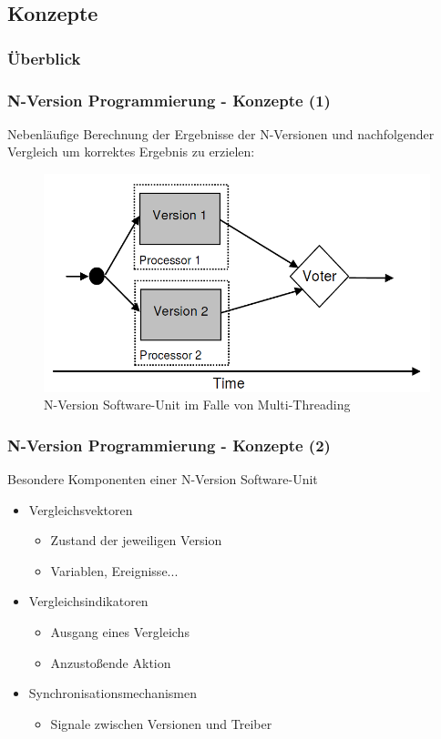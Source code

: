 \subsection{Konzepte}
%
%
\begin{frame}
	\frametitle{Überblick}
	\tableofcontents[currentsubsection]
\end{frame}
%
%
\begin{frame}
	\frametitle{N-Version Programmierung - Konzepte (1)}
	Nebenläufige Berechnung der Ergebnisse der N-Versionen und nachfolgender Vergleich um korrektes Ergebnis zu erzielen:
	\begin{figure}
		\includegraphics[scale=0.3]{grafiken/multi-thread-n-version.png}		
		\caption{N-Version Software-Unit im Falle von Multi-Threading
			\footnotemark		
		}		
	\end{figure}
\end{frame}
%
%
\begin{frame}
	\frametitle{N-Version Programmierung - Konzepte (2)}
	Besondere Komponenten einer N-Version Software-Unit
	\begin{itemize}
		\item Vergleichsvektoren
		\begin{itemize}
			\item Zustand der jeweiligen Version
			\item Variablen, Ereignisse...
		\end{itemize}
		\pause
		\item Vergleichsindikatoren
		\begin{itemize}
			\item Ausgang eines Vergleichs
			\item Anzustoßende Aktion
		\end{itemize}
		\pause
		\item Synchronisationsmechanismen
		\begin{itemize}
			\item Signale zwischen Versionen und Treiber
		\end{itemize}
	\end{itemize}
\end{frame}
